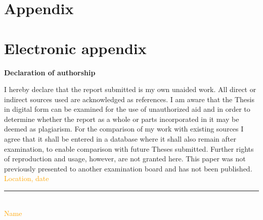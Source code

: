 \documentclass[12pt]{article}
\begin{document}

\listoffigures
\newpage
\listoftables
\newpage


\RaggedRight


\newpage



\setcounter{page}{1}

\appendix

\section{Appendix}
\label{app}

\newpage

\section{Electronic appendix}
\label{el_app}


\newpage


\Large
\noindent
\textbf{Declaration of authorship} 
\vspace{0.5cm}
\noindent
\normalsize

I hereby declare that the report submitted is my own unaided work. All direct 
or indirect sources used are acknowledged as references. I am aware that the 
Thesis in digital form can be examined for the use of unauthorized aid and in 
order to determine whether the report as a whole or parts incorporated in it may 
be deemed as plagiarism. For the comparison of my work with existing sources I 
agree that it shall be entered in a database where it shall also remain after 
examination, to enable comparison with future Theses submitted. Further rights 
of reproduction and usage, however, are not granted here. This paper was not 
previously presented to another examination board and has not been published.
\\

\vspace{1cm}
\textcolor{orange}{Location, date} \\

\vspace{3cm}

\noindent\rule{0.5\textwidth}{0.4pt} \\

\textcolor{orange}{Name}

\end{document}
